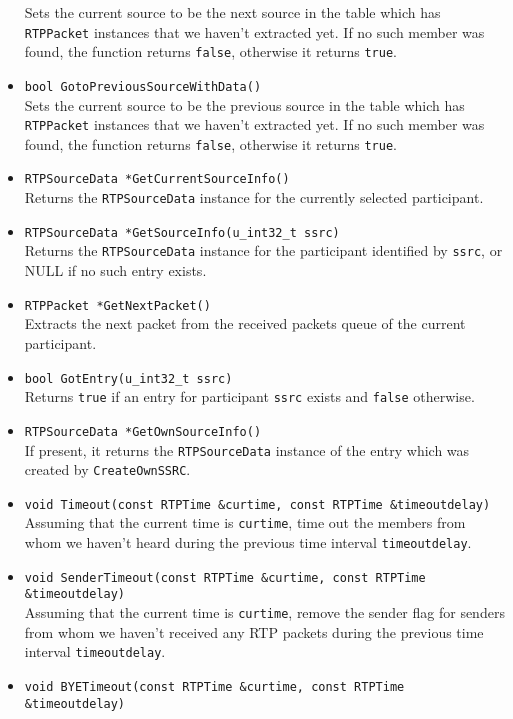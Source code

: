 \documentclass[12pt,a4paper]{article}
\begin{document}
\begin{itemize}
						Sets the current source to be the next source in the table
						which has {\tt RTPPacket} instances that we haven't extracted
						yet. If no such member was found, the function returns {\tt false},
						otherwise it returns {\tt true}.
					\item {\tt bool GotoPreviousSourceWithData()}\\
						Sets the current source to be the previous source in the table
						which has {\tt RTPPacket} instances that we haven't extracted
						yet. If no such member was found, the function returns {\tt false},
						otherwise it returns {\tt true}.
					\item {\tt RTPSourceData *GetCurrentSourceInfo()}\\
						Returns the {\tt RTPSourceData} instance for the currently
						selected participant.
					\item {\tt RTPSourceData *GetSourceInfo(u\_int32\_t ssrc)}\\
						Returns the {\tt RTPSourceData} instance for the participant
						identified by {\tt ssrc}, or NULL if no such entry exists.
					\item {\tt RTPPacket *GetNextPacket()}\\
						Extracts the next packet from the received packets queue
						of the current participant.
					\item {\tt bool GotEntry(u\_int32\_t ssrc)}\\
						Returns {\tt true} if an entry for participant {\tt ssrc} exists
						and {\tt false} otherwise.
					\item {\tt RTPSourceData *GetOwnSourceInfo()}\\
						If present, it returns the {\tt RTPSourceData} instance of
						the entry which was created by {\tt CreateOwnSSRC}.
					\item {\tt void Timeout(const RTPTime \&curtime, const RTPTime \&timeoutdelay)}\\
						Assuming that the current time is {\tt curtime}, time out the
						members from whom we haven't heard during the previous time
						interval {\tt timeoutdelay}.
					\item {\tt void SenderTimeout(const RTPTime \&curtime, const RTPTime \&timeoutdelay)}\\
						Assuming that the current time is {\tt curtime}, remove the
						sender flag for senders from whom we haven't received any RTP
						packets during the previous time interval {\tt timeoutdelay}.
					\item {\tt void BYETimeout(const RTPTime \&curtime, const RTPTime \&timeoutdelay)}\\

\end{itemize}
\end{document}
